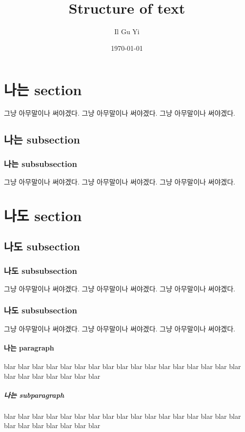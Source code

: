 \documentclass[a4paper,11pt]{article}
\author{Il Gu Yi}
\title{Structure of text}
\date{\today}
\begin{document}
\maketitle

\tableofcontents

\section{나는 section}
그냥 아무말이나 써야겠다.
그냥 아무말이나 써야겠다.
그냥 아무말이나 써야겠다.

\subsection{나는 subsection}
\subsubsection{나는 subsubsection}
그냥 아무말이나 써야겠다.
그냥 아무말이나 써야겠다.
그냥 아무말이나 써야겠다.


\section{나도 section}
\subsection{나도 subsection}
\subsubsection{나도 subsubsection}
그냥 아무말이나 써야겠다.
그냥 아무말이나 써야겠다.
그냥 아무말이나 써야겠다.

\subsubsection*{나도 subsubsection}
그냥 아무말이나 써야겠다.
그냥 아무말이나 써야겠다.
그냥 아무말이나 써야겠다.


\paragraph{나는 paragraph}
blar blar blar blar blar blar blar blar
blar blar blar blar blar blar blar blar
blar blar blar blar blar blar blar blar

\subparagraph{나는 subparagraph}
blar blar blar blar blar blar blar blar
blar blar blar blar blar blar blar blar
blar blar blar blar blar blar blar blar
\end{document}

